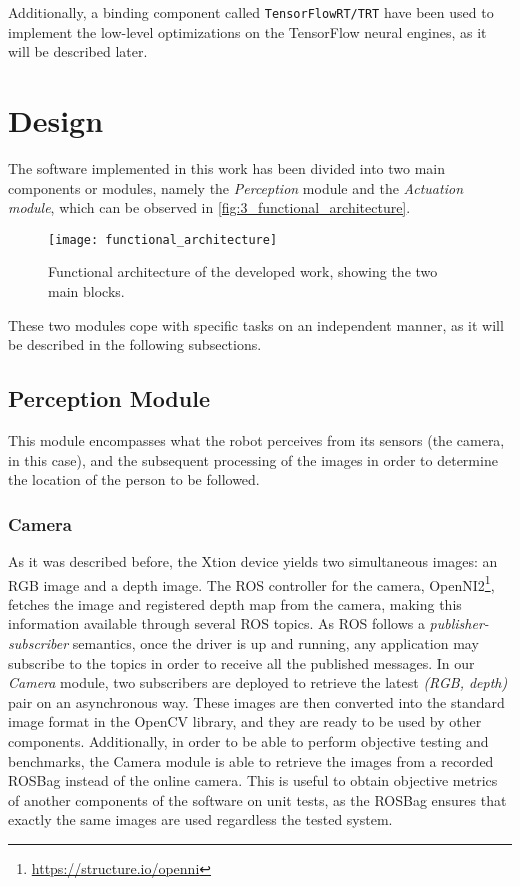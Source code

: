 Additionally, a binding component called \texttt{TensorFlowRT/TRT} have been used to implement the low-level optimizations on the TensorFlow neural engines, as it will be described later.


\newpage
\section{Design}
\label{sec:3_design}
The software implemented in this work has been divided into two main components or modules, namely the \textit{Perception} module and the \textit{Actuation module}, which can be observed in \autoref{fig:3_functional_architecture}.

\begin{figure}[h]
	\centering
	\texttt{[image: functional\_architecture]}
	\caption{Functional architecture of the developed work, showing the two main blocks.}
	\label{fig:3_functional_architecture}
\end{figure}

These two modules cope with specific tasks on an independent manner, as it will be described in the following subsections.


\subsection{Perception Module}
\label{sec:3_perception}
This module encompasses what the robot perceives from its sensors (the camera, in this case), and the subsequent processing of the images in order to determine the location of the person to be followed.
\subsubsection{Camera}
As it was described before, the Xtion device yields two simultaneous images: an RGB image and a depth image. The ROS controller for the camera, OpenNI2\footnote{\url{https://structure.io/openni}}, fetches the image and registered depth map from the camera, making this information available through several ROS topics. As ROS follows a \textit{publisher-subscriber} semantics, once the driver is up and running, any application may subscribe to the topics in order to receive all the published messages. In our \textit{Camera} module, two subscribers are deployed to retrieve the latest \textit{(RGB, depth)} pair on an asynchronous way. These images are then converted into the standard image format in the OpenCV library, and they are ready to be used by other components. Additionally, in order to be able to perform objective testing and benchmarks, the Camera module is able to retrieve the images from a recorded ROSBag instead of the online camera. This is useful to obtain objective metrics of another components of the software on unit tests, as the ROSBag ensures that exactly the same images are used regardless the tested system.\\

